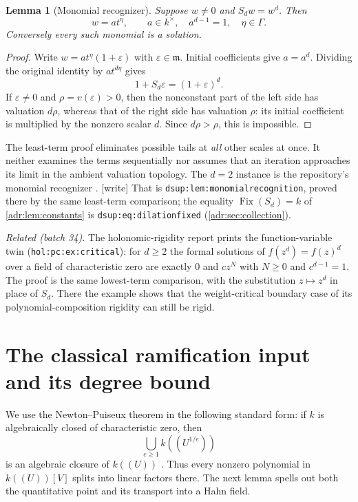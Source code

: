 \documentclass[11pt,letterpaper]{article}
\numberwithin{equation}{section}
\newtheorem{lemma}[lemma]{Lemma}
\theoremstyle{definition}
\theoremstyle{remark}
\newcommand{\lbl}[1]{\nolinkurl{#1}}%
\newcommand{\wtag}{\textup{[write]}}%
\begin{document}
\begin{lemma}[Monomial recognizer]\label{adr:lem:monomial}
Suppose $w\ne0$ and $S_dw=w^d$. Then
\begin{equation}\label{adr:eq:monomial-recognizer}
 w=a t^\eta,\qquad a\in k^\times,\quad a^{d-1}=1,
 \quad\eta\in\Gamma.
\end{equation}
Conversely every such monomial is a solution.
\end{lemma}
\begin{proof}
Write $w=a t^\eta(1+\varepsilon)$ with $\varepsilon\in\mathfrak m$.
Initial coefficients give $a=a^d$. Dividing the original identity by
$a t^{d\eta}$ gives
\[
 1+S_d\varepsilon=(1+\varepsilon)^d.
\]
If $\varepsilon\ne0$ and $\rho=v(\varepsilon)>0$, then the nonconstant
part of the left side has valuation $d\rho$, whereas that of the right
side has valuation $\rho$: its initial coefficient is multiplied by the
nonzero scalar $d$. Since $d\rho>\rho$, this is impossible.
\end{proof}

The least-term proof eliminates possible tails at \emph{all} other scales
at once. It neither examines the terms sequentially nor assumes that an
iteration approaches its limit in the ambient valuation topology.
The $d=2$ instance is the repository's monomial recognizer
\cite{RepoDilation}. \wtag{} That is \lbl{dsup:lem:monomialrecognition},
proved there by the same least-term comparison; the equality
$\operatorname{Fix}(S_d)=k$ of \cref{adr:lem:constants} is
\lbl{dsup:eq:dilationfixed} (\cref{adr:sec:collection}).

\emph{Related (batch 34).} The holonomic-rigidity report prints the
function-variable twin (\lbl{hol:pc:ex:critical}): for $d\ge2$ the formal
solutions of $f(z^d)=f(z)^d$ over a field of characteristic zero are exactly
$0$ and $cz^N$ with $N\ge0$ and $c^{d-1}=1$. The proof is the same
lowest-term comparison, with the substitution $z\mapsto z^d$ in place of
$S_d$. There the example shows that the weight-critical boundary case of its
polynomial-composition rigidity can still be rigid.

\section{The classical ramification input and its degree bound}
\label{adr:sec:puiseux}

We use the Newton--Puiseux theorem in the following standard form:
if $k$ is algebraically closed of characteristic zero, then
\[
 \bigcup_{e\ge1}k((U^{1/e}))
\]
is an algebraic closure of $k((U))$ \cite{MC}. Thus every nonzero
polynomial in $k((U))[V]$ splits into linear factors there. The next
lemma spells out both the quantitative point and its transport into a
Hahn field.
\end{document}

